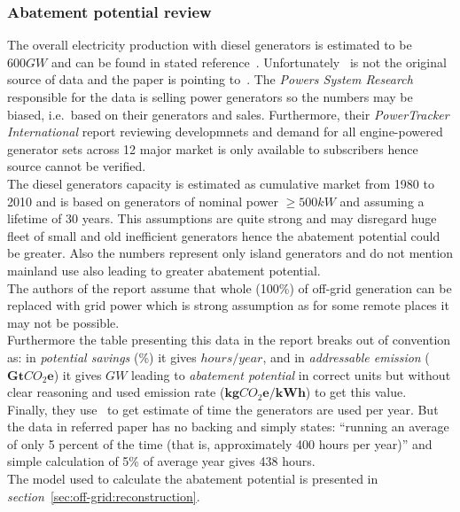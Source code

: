 \documentclass[11pt, twocolumn]{article}
\begin{document}
\subsubsection{Abatement potential review}
The overall electricity production with diesel generators is estimated to be $600 GW$ and can be found in stated reference~\citep{pieper2011revisiting}. Unfortunately~\citep{pieper2011revisiting} is not the original source of data and the paper is pointing to~\citep{PowersSystemResearch}. The \emph{Powers System Research} responsible for the data is selling power generators so the numbers may be biased, i.e.\ based on their generators and sales. Furthermore, their \emph{PowerTracker International} report reviewing developmnets and demand for all engine-powered generator sets across 12 major market is only available to subscribers hence source cannot be verified.\\
The diesel generators capacity is estimated as cumulative market from 1980 to 2010 and is based on generators of nominal power $\geq 500kW$ and assuming a lifetime of 30 years. This assumptions are quite strong and may disregard huge fleet of small and old inefficient generators hence the abatement potential could be greater. Also the numbers represent only island generators and do not mention mainland use also leading to greater abatement potential.\\
The authors of the report assume that whole (100\%) of off-grid generation can be replaced with grid power which is strong assumption as for some remote places it may not be possible.\\
Furthermore the table presenting this data in the report breaks out of convention as: in \emph{potential savings} (\%) it gives $hours/year$, and in \emph{addressable emission} ($\mathbf{Gt}CO_2\mathbf{e}$) it gives $GW$ leading to \emph{abatement potential} in correct units but without clear reasoning and used emission rate ($\mathbf{kg}CO_2\mathbf{e}/\mathbf{kWh}$) to get this value.\\
Finally, they use~\citep{pieper2011revisiting} to get estimate of time the generators are used per year. But the data in referred paper has no backing and simply states: ``running an average of only 5 percent of the time (that is, approximately 400 hours per year)'' and simple calculation of 5\% of average year gives 438 hours.\\
The model used to calculate the abatement potential is presented in \emph{section}~\ref{sec:off-grid:reconstruction}.\\
\end{document}
